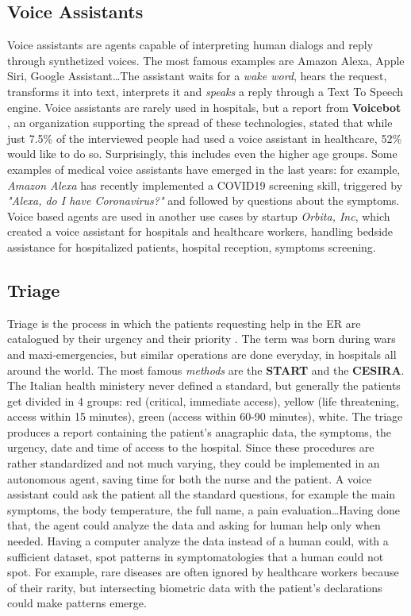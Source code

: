 \documentclass[conference]{IEEEtran}
\begin{document}
\subsection{Voice Assistants}
Voice assistants are agents capable of interpreting human dialogs and reply through synthetized voices. The most famous examples are Amazon Alexa, Apple Siri, Google Assistant\dots The assistant waits for a \textit{wake word}, hears the request, transforms it into text, interprets it and \textit{speaks} a reply through a Text To Speech engine. Voice assistants are rarely used in hospitals, but a report from \textbf{Voicebot} \cite{voicebot}, an organization supporting the spread of these technologies, stated that while just 7.5\% of the interviewed people had used a voice assistant in healthcare, 52\% would like to do so. Surprisingly, this includes even the higher age groups.
Some examples of medical voice assistants have emerged in the last years: for example, \textit{Amazon Alexa} has recently implemented a COVID19 screening skill, triggered by \textit{"Alexa, do I have Coronavirus?"} and followed by questions about the symptoms. Voice based agents are used in another use cases by startup \textit{Orbita, Inc}, which created a voice assistant for hospitals and healthcare workers, handling bedside assistance for hospitalized patients, hospital reception, symptoms screening. 
\subsection{Triage}
Triage is the process in which the patients requesting help in the ER are catalogued by their urgency and their priority \cite{bazyar2020principle}. The term was born during wars and maxi-emergencies, but similar operations are done everyday, in hospitals all around the world. The most famous \textit{methods} are the \textbf{START} and the \textbf{CESIRA}. The Italian health ministery never defined a standard, but generally the patients get divided in 4 groups: red (critical, immediate access), yellow (life threatening, access within 15 minutes), green (access within 60-90 minutes), white. The triage produces a report containing the patient's anagraphic data, the symptoms, the urgency, date and time of access to the hospital. Since these procedures are rather standardized and not much varying, they could be implemented in an autonomous agent, saving time for both the nurse and the patient. A voice assistant could ask the patient all the standard questions, for example the main symptoms, the body temperature, the full name, a pain evaluation\dots Having done that, the agent could analyze the data and asking for human help only when needed. Having a computer analyze the data instead of a human could, with a sufficient dataset, spot patterns in symptomatologies that a human could not spot. For example, rare diseases are often ignored by healthcare workers because of their rarity, but intersecting biometric data with the patient's declarations could make patterns emerge.
\end{document}
